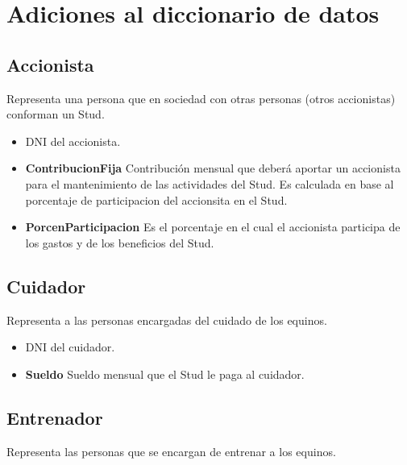 \documentclass[a4paper,11pt]{article}
\begin{document}
\FloatBarrier

\section{Adiciones al diccionario de datos}

\subsection{Accionista}

Representa una persona que en sociedad con otras personas (otros accionistas)
conforman un Stud.

\begin{itemize}

  \item \textbf{\uline{}} DNI del accionista.

  \item \textbf{ContribucionFija} Contribución mensual que deberá aportar
    un accionista para el mantenimiento de las actividades del Stud. Es calculada
    en base al porcentaje de participacion del accionsita en el Stud.

  \item \textbf{PorcenParticipacion} Es el porcentaje en el cual el accionista 
  participa de los gastos y de los beneficios del Stud. 

\end{itemize}

\subsection{Cuidador}

Representa a las personas encargadas del cuidado de los equinos.

\begin{itemize}

  \item \textbf{\uline{}} DNI del cuidador.

  \item \textbf{Sueldo} Sueldo mensual que el Stud le paga al cuidador.
  
\end{itemize}

\subsection{Entrenador}

Representa las personas que se encargan de entrenar a los equinos.
\end{document}
